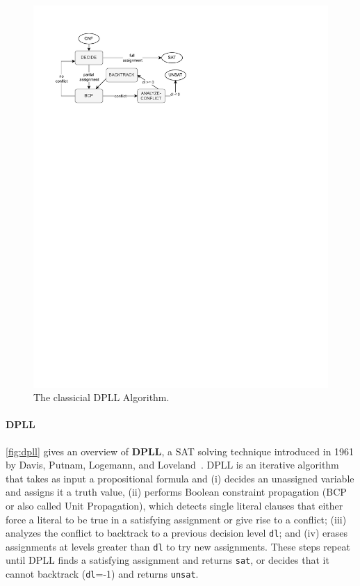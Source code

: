 \documentclass[oneside,11pt,dvipsnames]{book}
\numberwithin{equation}{section}
\theoremstyle{definition}
\theoremstyle{remark}
\begin{document}
\begin{figure}
  \includegraphics[width=0.8\linewidth]{figure/dpll.pdf}
  \caption{\label{fig:dpll} The classicial DPLL Algorithm.}
\end{figure}

\paragraph{DPLL} \autoref{fig:dpll} gives an overview of \textbf{DPLL}, a SAT solving technique introduced in 1961 by Davis, Putnam, Logemann, and Loveland~\cite{davis1962machine}. DPLL is an iterative algorithm that takes as input a propositional formula and (i) decides an unassigned variable and assigns it a truth value, (ii) performs Boolean constraint propagation (BCP or also called Unit Propagation),  which detects single literal clauses that either force a literal to be true in a satisfying assignment or give rise to a conflict; (iii) analyzes the conflict to backtrack to a previous decision level \texttt{dl}; and (iv) erases assignments at levels greater than \texttt{dl} to try new  assignments. These steps repeat until DPLL finds  a satisfying assignment and returns \texttt{sat}, or decides that it cannot backtrack (\texttt{dl}=-1) and returns \texttt{unsat}.
\end{document}
